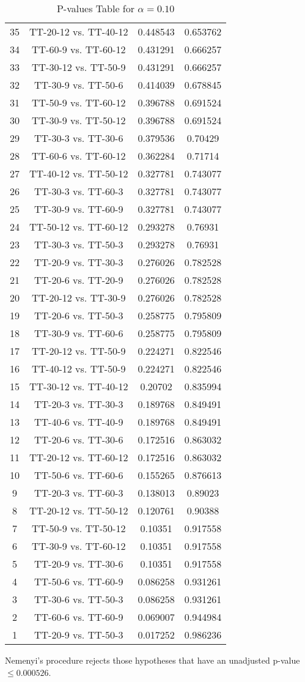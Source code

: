 \documentclass[a4paper,10pt]{article}
\begin{document}
\begin{landscape}
\begin{table}[!htp]
\begin{tabular}{cccc}
35&TT-20-12 vs. TT-40-12&0.448543&0.653762\\
34&TT-60-9 vs. TT-60-12&0.431291&0.666257\\
33&TT-30-12 vs. TT-50-9&0.431291&0.666257\\
32&TT-30-9 vs. TT-50-6&0.414039&0.678845\\
31&TT-50-9 vs. TT-60-12&0.396788&0.691524\\
30&TT-30-9 vs. TT-50-12&0.396788&0.691524\\
29&TT-30-3 vs. TT-30-6&0.379536&0.70429\\
28&TT-60-6 vs. TT-60-12&0.362284&0.71714\\
27&TT-40-12 vs. TT-50-12&0.327781&0.743077\\
26&TT-30-3 vs. TT-60-3&0.327781&0.743077\\
25&TT-30-9 vs. TT-60-9&0.327781&0.743077\\
24&TT-50-12 vs. TT-60-12&0.293278&0.76931\\
23&TT-30-3 vs. TT-50-3&0.293278&0.76931\\
22&TT-20-9 vs. TT-30-3&0.276026&0.782528\\
21&TT-20-6 vs. TT-20-9&0.276026&0.782528\\
20&TT-20-12 vs. TT-30-9&0.276026&0.782528\\
19&TT-20-6 vs. TT-50-3&0.258775&0.795809\\
18&TT-30-9 vs. TT-60-6&0.258775&0.795809\\
17&TT-20-12 vs. TT-50-9&0.224271&0.822546\\
16&TT-40-12 vs. TT-50-9&0.224271&0.822546\\
15&TT-30-12 vs. TT-40-12&0.20702&0.835994\\
14&TT-20-3 vs. TT-30-3&0.189768&0.849491\\
13&TT-40-6 vs. TT-40-9&0.189768&0.849491\\
12&TT-20-6 vs. TT-30-6&0.172516&0.863032\\
11&TT-20-12 vs. TT-60-12&0.172516&0.863032\\
10&TT-50-6 vs. TT-60-6&0.155265&0.876613\\
9&TT-20-3 vs. TT-60-3&0.138013&0.89023\\
8&TT-20-12 vs. TT-50-12&0.120761&0.90388\\
7&TT-50-9 vs. TT-50-12&0.10351&0.917558\\
6&TT-30-9 vs. TT-60-12&0.10351&0.917558\\
5&TT-20-9 vs. TT-30-6&0.10351&0.917558\\
4&TT-50-6 vs. TT-60-9&0.086258&0.931261\\
3&TT-30-6 vs. TT-50-3&0.086258&0.931261\\
2&TT-60-6 vs. TT-60-9&0.069007&0.944984\\
1&TT-20-9 vs. TT-50-3&0.017252&0.986236\\
\hline
\end{tabular}
\caption{P-values Table for $\alpha=0.10$}
\end{table}Nemenyi's procedure rejects those hypotheses that have an unadjusted p-value $\le0.000526$.


\end{landscape}
\end{document}
